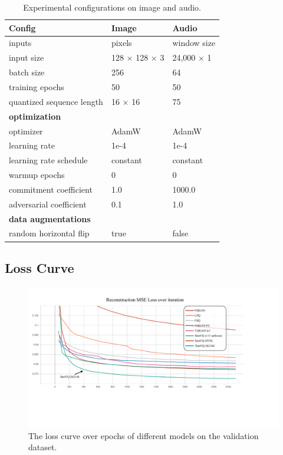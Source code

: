 \begin{table}[htbp]
\centering
\begin{tabular}	{l|l|l}
\toprule
Config & Image & Audio \\
\midrule
    inputs & pixels & window size \\
    input size & 128 $\times$ 128 $\times$ 3 & 24,000 $\times$ 1 \\
	batch size & 256  & 64  \\
	training epochs & 50 & 50  \\
	quantized sequence length & 16 $\times$ 16  & 75 \\
	\textbf{optimization} \\
	optimizer & AdamW  & AdamW \\ 
	learning rate & 1e-4 & 1e-4 \\
	learning rate schedule & constant & constant \\
	warmup epochs & 0  & 0 \\
    commitment coefficient & 1.0 & 1000.0 \\
    adversarial coefficient & 0.1 & 1.0 \\
	\textbf{data augmentations} \\
    random horizontal flip & true & false \\
	\bottomrule
\end{tabular}
\caption{Experimental configurations on image and audio.}
\label{tab:config}
\end{table}




\subsection{Loss Curve}
\label{appendix:loss}

\begin{figure}[htb]
    \centering
    \includegraphics[width=1.0\columnwidth]{material/loss.pdf}
    \caption{The loss curve over epochs of different models on the validation dataset.}
    \label{fig:loss}
\end{figure}


